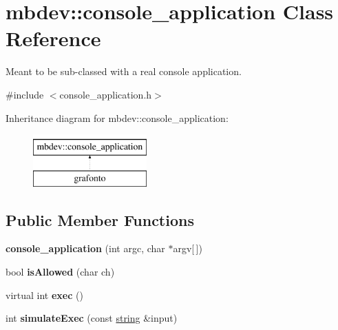 \hypertarget{classmbdev_1_1console__application}{\section{mbdev\-:\-:console\-\_\-application \-Class \-Reference}
\label{classmbdev_1_1console__application}
}


\-Meant to be sub-\/classed with a real console application.  




{\ttfamily \#include $<$console\-\_\-application.\-h$>$}

\-Inheritance diagram for mbdev\-:\-:console\-\_\-application\-:\begin{figure}[H]
\begin{center}
\leavevmode
\includegraphics[height=2.000000cm]{classmbdev_1_1console__application}
\end{center}
\end{figure}
\subsection*{\-Public \-Member \-Functions}
\begin{DoxyCompactItemize}
\item 
\hypertarget{classmbdev_1_1console__application_a8105151a36efcca192dcb3709c6ea652}{{\bfseries console\-\_\-application} (int argc, char $\ast$argv\mbox{[}$\,$\mbox{]})}\label{classmbdev_1_1console__application_a8105151a36efcca192dcb3709c6ea652}

\item 
\hypertarget{classmbdev_1_1console__application_a58242f26b9b2b32faa2525bea0f6eecd}{bool {\bfseries is\-Allowed} (char ch)}\label{classmbdev_1_1console__application_a58242f26b9b2b32faa2525bea0f6eecd}

\item 
\hypertarget{classmbdev_1_1console__application_a4da56afaaaf53820dde5551ae34bc8da}{virtual int {\bfseries exec} ()}\label{classmbdev_1_1console__application_a4da56afaaaf53820dde5551ae34bc8da}

\item 
\hypertarget{classmbdev_1_1console__application_aaba2a906eb64593cc43ceec6ad96e830}{int {\bfseries simulate\-Exec} (const \hyperlink{classmbdev_1_1string}{string} \&input)}\label{classmbdev_1_1console__application_aaba2a906eb64593cc43ceec6ad96e830}

\end{DoxyCompactItemize}

